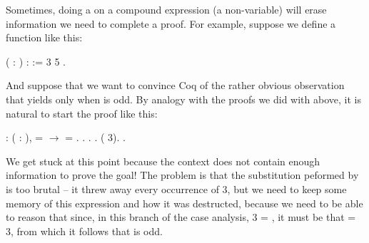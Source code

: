 \documentclass[12pt]{report}
\begin{document}
 Sometimes, doing a  on a compound expression (a
    non-variable) will erase information we need to complete a proof.  For example, suppose
    we define a function  like this: \begin{coqdoccode}
\coqdocemptyline
\coqdocnoindent
{}  ( : ) :  :=\coqdoceol
\coqdocindent{1.00em}
   3  \coqdoceol
\coqdocindent{1.00em}
    5  \coqdoceol
\coqdocindent{1.00em}
 .\coqdoceol
\coqdocemptyline
\end{coqdoccode}
And suppose that we want to convince Coq of the rather
    obvious observation that   yields  only when 
    is odd.  By analogy with the proofs we did with  above,
    it is natural to start the proof like this: \begin{coqdoccode}
\coqdocemptyline
\coqdocnoindent
{}  : \coqdockw{\ensuremath{\forall}} ( : ),\coqdoceol
\coqdocindent{2.50em}
  =  \ensuremath{\rightarrow}\coqdoceol
\coqdocindent{2.50em}
  = .\coqdoceol
\coqdocnoindent
{}.\coqdoceol
\coqdocindent{1.00em}
  .    .\coqdoceol
\coqdocindent{1.00em}
 (  3).\coqdoceol
\coqdocnoindent
{}.\coqdoceol
\coqdocemptyline
\end{coqdoccode}
We get stuck at this point because the context does not
    contain enough information to prove the goal!  The problem is that
    the substitution peformed by  is too brutal -- it threw
    away every occurrence of   3, but we need to keep some
    memory of this expression and how it was destructed, because we
    need to be able to reason that since, in this branch of the case
    analysis,   3 = , it must be that  = 3, from
    which it follows that  is odd.
\end{document}
